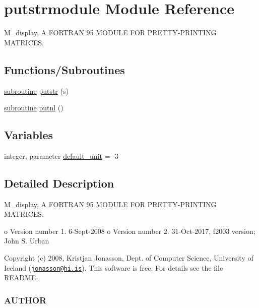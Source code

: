 \hypertarget{namespaceputstrmodule}{}\section{putstrmodule Module Reference}
\label{namespaceputstrmodule}


M\+\_\+display, A F\+O\+R\+T\+R\+AN 95 M\+O\+D\+U\+LE F\+OR P\+R\+E\+T\+T\+Y-\/\+P\+R\+I\+N\+T\+I\+NG M\+A\+T\+R\+I\+C\+ES.  


\subsection*{Functions/\+Subroutines}
\begin{DoxyCompactItemize}
\item 
\hyperlink{M__stopwatch_83_8txt_acfbcff50169d691ff02d4a123ed70482}{subroutine} \hyperlink{namespaceputstrmodule_a3557206c6eaead47ecd6a04e58f69f90}{putstr} (s)
\item 
\hyperlink{M__stopwatch_83_8txt_acfbcff50169d691ff02d4a123ed70482}{subroutine} \hyperlink{namespaceputstrmodule_ab85a50db8f38a797bd4ecf0b00a40e85}{putnl} ()
\end{DoxyCompactItemize}
\subsection*{Variables}
\begin{DoxyCompactItemize}
\item 
integer, parameter \hyperlink{namespaceputstrmodule_a7ec14945bb8449f20f21c0545b1825ee}{default\+\_\+unit} = -\/3
\end{DoxyCompactItemize}


\subsection{Detailed Description}
M\+\_\+display, A F\+O\+R\+T\+R\+AN 95 M\+O\+D\+U\+LE F\+OR P\+R\+E\+T\+T\+Y-\/\+P\+R\+I\+N\+T\+I\+NG M\+A\+T\+R\+I\+C\+ES. 

o Version number 1. 6-\/\+Sept-\/2008 o Version number 2. 31-\/\+Oct-\/2017, f2003 version; John S. Urban

Copyright (c) 2008, Kristjan Jonasson, Dept. of Computer Science, University of Iceland (\href{mailto:jonasson@hi.is}{\tt jonasson@hi.\+is}). This software is free. For details see the file R\+E\+A\+D\+ME.

\subsubsection*{A\+U\+T\+H\+OR}

